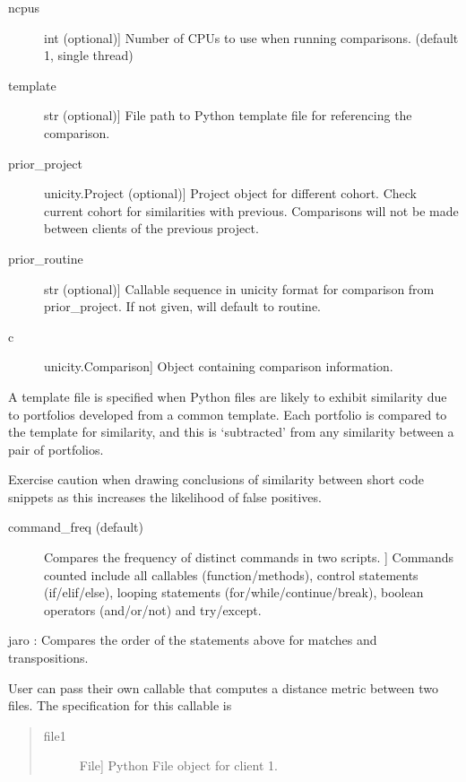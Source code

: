 \documentclass[letterpaper,10pt,english]{sphinxmanual}
\begin{document}
\begin{fulllineitems}
\begin{fulllineitems}
\begin{description}
\item[{ncpus}] \leavevmode{[}int (optional){]}
Number of CPUs to use when running comparisons. (default 1, single thread)

\item[{template}] \leavevmode{[}str (optional){]}
File path to Python template file for referencing the comparison.

\item[{prior\_project}] \leavevmode{[}unicity.Project (optional){]}
Project object for different cohort. Check current cohort for similarities with 
previous. Comparisons will not be made between clients of the previous project.

\item[{prior\_routine}] \leavevmode{[}str (optional){]}
Callable sequence in unicity format for comparison from prior\_project. If not given,
will default to routine.

\end{description}
\begin{description}
\item[{c}] \leavevmode{[}unicity.Comparison{]}
Object containing comparison information.

\end{description}

A template file is specified when Python files are likely to exhibit similarity
due to portfolios developed from a common template. Each portfolio is compared 
to the template for similarity, and this is ‘subtracted’ from any similarity 
between a pair of portfolios.

Exercise caution when drawing conclusions of similarity between short code snippets as
this increases the likelihood of false positives.
\begin{description}
\item[{command\_freq (default)}] \leavevmode{[}Compares the frequency of distinct commands in two scripts. {]}
Commands counted include all callables (function/methods), control statements 
(if/elif/else), looping statements (for/while/continue/break), boolean operators 
(and/or/not) and try/except.

\end{description}

jaro : Compares the order of the statements above for matches and transpositions.

User can pass their own callable that computes a distance metric between two files. The
specification for this callable is
\begin{quote}
\begin{description}
\item[{file1}] \leavevmode{[}File{]}
Python File object for client 1.


\end{description}
\end{quote}
\end{fulllineitems}
\end{fulllineitems}
\end{document}
